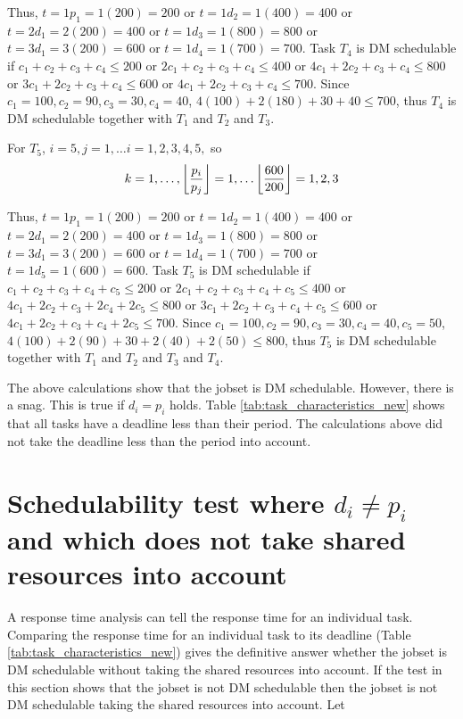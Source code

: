 \documentclass[10pt]{article}
\DeclarePairedDelimiter\floor{\lfloor}{\rfloor}
\begin{document}
Thus, $t = 1 p_1 = 1(200) = 200$ or $t = 1 d_2 = 1(400) = 400$ or $t = 2 d_1 = 2(200) = 400$ or $t = 1 d_3 = 1(800) = 800$ or $t = 3 d_1 = 3(200) = 600$ or $t = 1 d_4 = 1(700) = 700$.
Task $T_4$ is DM schedulable if $c_1 + c_2 + c_3 + c_4 \leq 200$ or $2c_1 + c_2 + c_3 + c_4 \leq 400$ or $4c_1 + 2c_2 + c_3 + c_4 \leq 800$ or $3c_1 + 2c_2 + c_3 + c_4 \leq 600$ or $4c_1 + 2c_2 + c_3 + c_4 \leq 700$.
Since $c_1 = 100, c_2 = 90, c_3 = 30, c_4 = 40$, $4(100) + 2(180) + 30 + 40 \leq 700$, thus $T_4$ is DM schedulable together with $T_1$ and $T_2$ and $T_3$.

\newpage
For $T_5$, $i = 5, j = 1,\dots i = 1,2,3,4,5,$ so
\begin{equation}
    k = 1,\dots,\floor*{\frac{p_i}{p_j}} = 1,\dots \floor*{\frac{600}{200}} = 1, 2, 3
\end{equation}

Thus, $t = 1 p_1 = 1(200) = 200$ or $t = 1 d_2 = 1(400) = 400$ or $t = 2 d_1 = 2(200) = 400$ or $t = 1 d_3 = 1(800) = 800$ or $t = 3 d_1 = 3(200) = 600$ or $t = 1 d_4 = 1(700) = 700$ or $t = 1 d_5 = 1(600) = 600$.
Task $T_5$ is DM schedulable if $c_1 + c_2 + c_3 + c_4 + c_5 \leq 200$ or $2c_1 + c_2 + c_3 + c_4 + c_5 \leq 400$ or $4c_1 + 2c_2 + c_3 + 2c_4 + 2c_5 \leq 800$ or $3c_1 + 2c_2 + c_3 + c_4 + c_5 \leq 600$ or $4c_1 + 2c_2 + c_3 + c_4 + 2c_5 \leq 700$.
Since $c_1 = 100, c_2 = 90, c_3 = 30, c_4 = 40, c_5 = 50$, $4(100) + 2(90) + 30 + 2(40) + 2(50) \leq 800$, thus $T_5$ is DM schedulable together with $T_1$ and $T_2$ and $T_3$ and $T_4$.


The above calculations show that the jobset is DM schedulable. 
However, there is a snag.
This is true if $d_i = p_i$ holds.
Table \ref{tab:task_characteristics_new} shows that all tasks have a deadline less than their period.
The calculations above did not take the deadline less than the period into account.

\section{Schedulability test where $d_i \neq p_i$ and which does not take shared resources into account}

A response time analysis can tell the response time for an individual task.
Comparing the response time for an individual task to its deadline (Table \ref{tab:task_characteristics_new}) gives the definitive answer whether the jobset is DM schedulable without taking the shared resources into account.
If the test in this section shows that the jobset is not DM schedulable then the jobset is not DM schedulable taking the shared resources into account.
Let 
\end{document}
